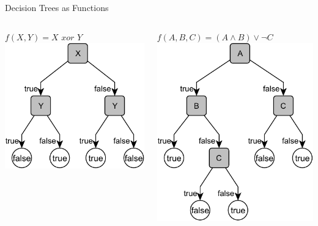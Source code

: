 \documentclass[14pt]{beamer}
\begin{document}
\begin{frame}{Decision Trees as Functions}
	\begin{columns}[t]
		\begin{column}{2in}
			$f(X, Y) = X \textit{ xor } Y$ \\[1em]
			\includegraphics[scale=.75]{xor}
		\end{column}
		\begin{column}{2in}
			$f(A, B, C) = (A \land B) \lor \lnot C$ \\[1em]
			\includegraphics[scale=.75]{abc}
		\end{column}
	\end{columns}
\end{frame}
\end{document}
